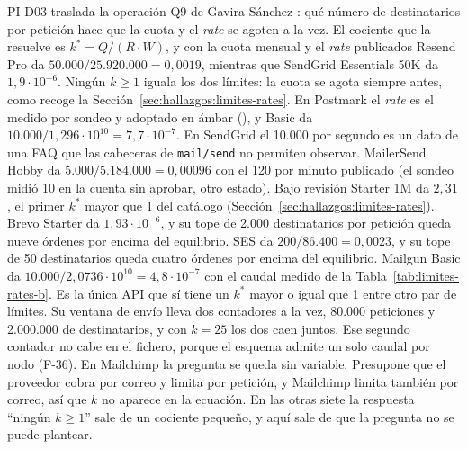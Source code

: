 PI-D03 traslada la operación Q9 de Gavira Sánchez \citep{gavira2026tfm}: qué número
de destinatarios por petición hace que la cuota y el \textit{rate} se agoten a la vez.
El cociente que la resuelve es $k^{*} = Q/(R \cdot W)$, y con la cuota mensual y el
\textit{rate} publicados Resend Pro da $50.000 / 25.920.000 = 0{,}0019$, mientras que
SendGrid Essentials 50K da $1{,}9 \cdot 10^{-6}$.
Ningún $k \geq 1$ iguala los dos límites: la cuota se agota siempre antes, como recoge
la Sección~\ref{sec:hallazgos:limites-rates}. En Postmark el \textit{rate} es el medido
por sondeo y adoptado en ámbar (\semambar{}), y Basic da $10.000 / 1{,}296 \cdot 10^{10} =
7{,}7 \cdot 10^{-7}$. En SendGrid el 10.000 por segundo es un
dato de una FAQ que las cabeceras de \texttt{mail/send} no permiten observar.
MailerSend Hobby da $5.000 / 5.184.000 = 0{,}00096$ con el 120 por minuto publicado
(el sondeo midió 10 en la cuenta sin aprobar, otro estado). Bajo revisión Starter 1M
da $2{,}31$, el primer $k^{*}$ mayor que 1 del
catálogo (Sección~\ref{sec:hallazgos:limites-rates}).
Brevo Starter da $1{,}93 \cdot 10^{-6}$, y su tope de 2.000 destinatarios por petición
queda nueve órdenes por encima del equilibrio. SES da $200/86.400 = 0{,}0023$,
y su tope de 50 destinatarios queda cuatro órdenes por encima del equilibrio.
Mailgun Basic da $10.000 / 2{,}0736 \cdot 10^{10} = 4{,}8 \cdot 10^{-7}$ con el caudal medido de la Tabla~\ref{tab:limites-rates-b}. Es la única API que sí tiene un $k^{*}$ mayor
o igual que 1 entre otro par de límites. Su ventana de envío lleva dos contadores a la
vez, 80.000 peticiones y 2.000.000 de destinatarios, y con $k = 25$ los dos caen juntos.
Ese segundo contador no cabe en el fichero, porque el esquema admite un solo caudal por
nodo (F-36).
En Mailchimp la pregunta se queda sin variable. Presupone que el proveedor cobra por
correo y limita por petición, y Mailchimp limita también por correo, así que $k$ no
aparece en la ecuación. En las otras siete la respuesta ``ningún $k \geq 1$'' sale de un
cociente pequeño, y aquí sale de que la pregunta no se puede plantear.

